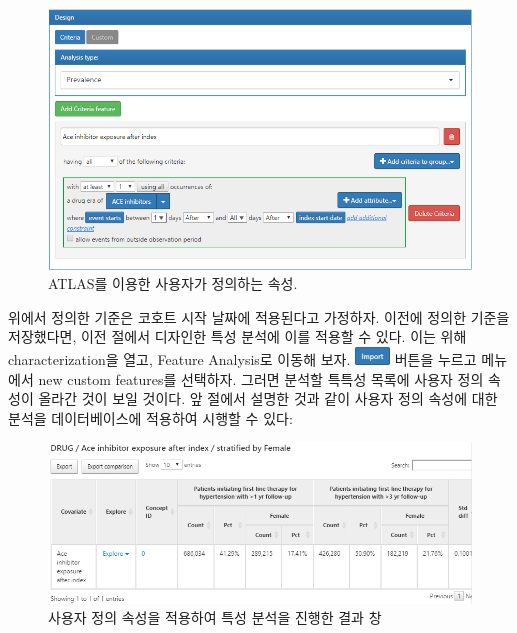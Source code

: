 \documentclass[10.5pt]{book}
\theoremstyle{definition}
\theoremstyle{definition}
\theoremstyle{definition}
\theoremstyle{remark}
\begin{document}
\begin{figure}

{\centering \includegraphics[width=1\linewidth]{images/Characterization/atlasCharacterizationCustomFeature} 

}

\caption{ATLAS를 이용한 사용자가 정의하는 속성.}\label{fig:atlasCharacterizationCustomFeature}
\end{figure}

위에서 정의한 기준은 코호트 시작 날짜에 적용된다고 가정하자. 이전에
정의한 기준을 저장했다면, 이전 절에서 디자인한 특성 분석에 이를 적용할
수 있다. 이는 위해 characterization을 열고, Feature Analysis로 이동해
보자. \includegraphics{images/Characterization/atlasImportButton.png}
버튼을 누르고 메뉴에서 new custom features를 선택하자. 그러면 분석할
특특성 목록에 사용자 정의 속성이 올라간 것이 보일 것이다. 앞 절에서
설명한 것과 같이 사용자 정의 속성에 대한 분석을 데이터베이스에 적용하여
시행할 수 있다:

\begin{figure}

{\centering \includegraphics[width=1\linewidth]{images/Characterization/atlasCharacterizationCustomFeatureResults} 

}

\caption{사용자 정의 속성을 적용하여 특성 분석을 진행한 결과 창}\label{fig:atlasCharacterizationCustomFeatureResults}
\end{figure}
\end{document}
